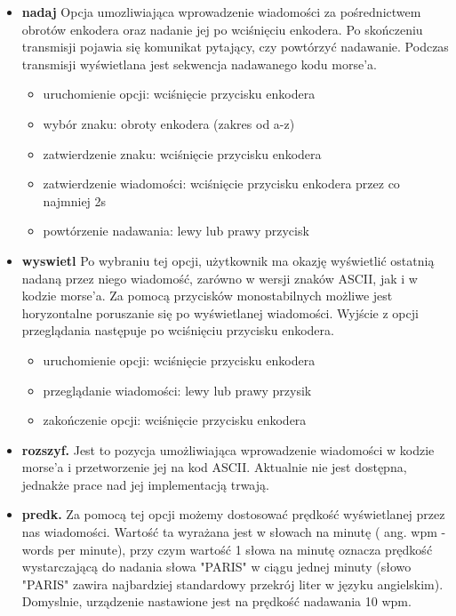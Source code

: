 \documentclass{article}
\begin{document}
\begin{itemize}
	\item	\textbf{nadaj}\newline
Opcja umozliwiająca wprowadzenie wiadomości za pośrednictwem obrotów enkodera oraz nadanie jej po wciśnięciu enkodera. Po skończeniu transmisji pojawia się komunikat pytający, czy powtórzyć nadawanie. Podczas transmisji wyświetlana jest sekwencja nadawanego kodu morse'a.

	\begin{itemize}
	\item uruchomienie opcji: wciśnięcie przycisku enkodera
	\item wybór znaku: obroty enkodera (zakres od a-z)
	\item zatwierdzenie znaku: wciśnięcie przycisku enkodera
	\item zatwierdzenie wiadomości: wciśnięcie przycisku enkodera przez co najmniej 2s
	\item powtórzenie nadawania: lewy lub prawy przycisk
	\end{itemize}

	\item	\textbf{wyswietl}\newline
Po wybraniu tej opcji, użytkownik ma okazję wyświetlić ostatnią nadaną przez niego wiadomość, zarówno w wersji znaków ASCII, jak i w kodzie morse'a. Za pomocą przycisków monostabilnych możliwe jest horyzontalne poruszanie się po wyświetlanej wiadomości. Wyjście z opcji przeglądania następuje po wciśnięciu przycisku enkodera.

	\begin{itemize}
	\item uruchomienie opcji: wciśnięcie przycisku enkodera
	\item przeglądanie wiadomości: lewy lub prawy przysik
	\item zakończenie opcji: wciśnięcie przycisku enkodera
	\end{itemize}

	\item	\textbf{rozszyf.}\newline
Jest to pozycja umożliwiająca wprowadzenie wiadomości w kodzie morse'a i przetworzenie jej na kod ASCII. Aktualnie nie jest dostępna, jednakże prace nad jej implementacją trwają.
	\item	\textbf{predk.}\newline
Za pomocą tej opcji możemy dostosować prędkość wyświetlanej przez nas wiadomości. Wartość ta wyrażana jest w słowach na minutę ( ang. wpm - words per minute), przy czym wartość 1 słowa na minutę oznacza prędkość wystarczającą do nadania słowa "PARIS" w ciągu jednej minuty (słowo "PARIS" zawira najbardziej standardowy przekrój liter w języku angielskim). Domyslnie, urządzenie nastawione jest na prędkość nadawania 10 wpm.


\end{itemize}
\end{document}
